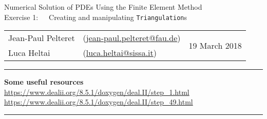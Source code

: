 \documentclass[11pt,answers]{exam}
\makeatletter
\newcommand{\makeheader}[3]{%
\setcounter{question}{0}
\begin{center}
{\sc Numerical Solution of PDEs Using the Finite Element Method}\vspace{2ex}\\
{\sc Exercise #1:\ \ \ #2}\vspace{2ex}\\
\begin{tabular*}{\textwidth}{ll @{\extracolsep{\fill}}r}
Jean-Paul Pelteret & (\url{jean-paul.pelteret@fau.de}) & \multirow{2}{*}{#3} \\
Luca Heltai & (\url{luca.heltai@sissa.it}) & \\
\end{tabular*}
\end{center}
}
\newcommand{\makeresources}[1]{%
\rule{\textwidth}{0.6mm}
\textbf{Some useful resources}\\[1.5ex]
#1 \par
\rule{\textwidth}{0.6mm}
}
\makeatother
\begin{document}
%
%




\clearpage
\makeheader{1}{Creating and manipulating \texttt{Triangulation}s}{19 March 2018}
\makeresources{%
\url{https://www.dealii.org/8.5.1/doxygen/deal.II/step_1.html} \\
\url{https://www.dealii.org/8.5.1/doxygen/deal.II/step_49.html}
}
\end{document}
